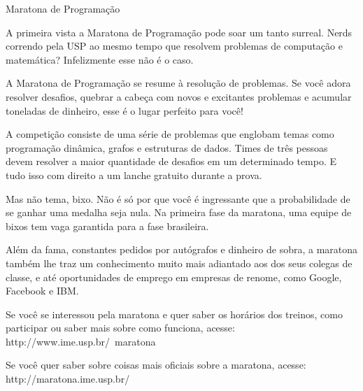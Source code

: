 \begin{secao}{Maratona de Programação}

A primeira vista a Maratona de Programação pode soar um tanto
surreal. Nerds correndo pela USP ao mesmo tempo que resolvem
problemas de computação e matemática? Infelizmente esse não
é o caso.

A Maratona de Programação se resume à resolução de problemas.
Se você adora resolver desafios, quebrar a cabeça com novos
e excitantes problemas e acumular toneladas de dinheiro, esse
é o lugar perfeito para você!

A competição consiste de uma série de problemas que englobam
temas como programação dinâmica, grafos e estruturas de dados.
Times de três pessoas devem resolver a maior quantidade de
desafios em um determinado tempo. E tudo isso com direito
a um lanche gratuito durante a prova.

Mas não tema, bixo. Não é só por que você é ingressante que
a probabilidade de se ganhar uma medalha seja nula. Na primeira 
fase da maratona, uma equipe de bixos tem vaga garantida para a 
fase brasileira.

Além da fama, constantes pedidos por autógrafos e dinheiro de sobra,
a maratona também lhe traz um conhecimento muito mais 
adiantado aos dos seus colegas de classe, e até oportunidades
de emprego em empresas de renome, como Google, Facebook e IBM.

Se você se interessou pela maratona e quer saber os horários dos
treinos, como participar ou saber mais sobre como funciona, acesse:
http://www.ime.usp.br/~maratona

Se você quer saber sobre coisas mais oficiais sobre a maratona, acesse:
http://maratona.ime.usp.br/

\end{secao}
